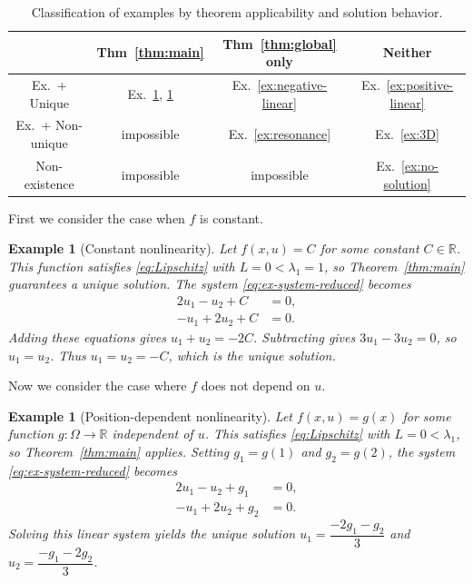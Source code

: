\documentclass{article}
\newtheorem{example}[theorem]{Example}
\numberwithin{equation}{section}
\numberwithin{theorem}{section}
\begin{document}
\begin{table}[h]
\centering
\begin{tabular}{|c|c|c|c|}
\hline
 & Thm~\ref{thm:main} & Thm~\ref{thm:global} only & Neither \\
\hline
Ex.\ + Unique & Ex.~\ref{ex:constant}, \ref{ex:f-of-x} & Ex.~\ref{ex:negative-linear} & Ex.~\ref{ex:positive-linear} \\
\hline
Ex.\ + Non-unique & impossible & Ex.~\ref{ex:resonance} & Ex.~\ref{ex:3D} \\
\hline
Non-existence & impossible & impossible & Ex.~\ref{ex:no-solution} \\
\hline
\end{tabular}
\caption{Classification of examples by theorem applicability and solution behavior.}
\label{tab:examples}
\end{table}
First we consider the case when $f$ is constant.
\begin{example}[Constant nonlinearity]\label{ex:constant}
Let $f(x, u) = C$ for some constant $C \in \mathbb{R}$. This function satisfies \eqref{eq:Lipschitz} with $L = 0 < \lambda_1 = 1$, so Theorem~\ref{thm:main} guarantees a unique solution. The system \eqref{eq:ex-system-reduced} becomes
\[\begin{aligned}
2u_1 - u_2 + C &= 0,\\
-u_1 + 2u_2 + C &= 0.
\end{aligned}\]
Adding these equations gives $u_1 + u_2 = -2C$. Subtracting gives $3u_1 - 3u_2 = 0$, so $u_1 = u_2$. Thus $u_1 = u_2 = -C$, which is the unique solution.
\end{example}
Now we consider the case where $f$ does not depend on $u$.
\begin{example}[Position-dependent nonlinearity]\label{ex:f-of-x}
Let $f(x, u) = g(x)$ for some function $g\colon\Omega \to \mathbb{R}$ independent of $u$. This satisfies \eqref{eq:Lipschitz} with $L = 0 < \lambda_1$, so Theorem~\ref{thm:main} applies. Setting $g_1 = g(1)$ and $g_2 = g(2)$, the system \eqref{eq:ex-system-reduced} becomes
\[\begin{aligned}
2u_1 - u_2 + g_1 &= 0,\\
-u_1 + 2u_2 + g_2 &= 0.
\end{aligned}\]
Solving this linear system yields the unique solution $u_1 = \dfrac{-2g_1 - g_2}{3}$ and $u_2 = \dfrac{-g_1 - 2g_2}{3}$.
\end{example}
\end{document}
